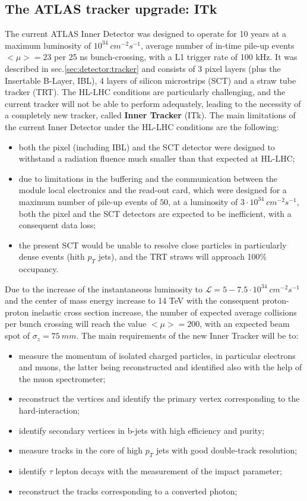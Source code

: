 \documentclass[a4paper,twoside,12pt]{article}
\begin{document}
\subsection{The ATLAS tracker upgrade: ITk}
The current ATLAS Inner Detector was designed to operate for 10 years at a maximum luminosity of $10^{34}\ cm^{-2} s^{-1}$, 
average number of in-time pile-up events $<\mu> = 23$ per 25 ns bunch-crossing, with a L1 trigger rate of 100 kHz\cite{loi}. It
was described in sec.\ref{sec:detector:tracker} and consists of 3 pixel layers (plus the Insertable B-Layer, IBL), 4 layers of silicon microstrips (SCT)
and a straw tube tracker (TRT). The HL-LHC conditions are particularly challenging, and the current tracker will not be able to perform adequately, leading to the necessity of a completely new tracker, called \textbf{Inner Tracker} (ITk). The main limitations of the current Inner Detector under the HL-LHC conditions are the following:

\begin{itemize}
\item both the pixel (including IBL) and the SCT detector were designed to withstand a radiation fluence much smaller
than that expected at HL-LHC;
\item due to limitations in the buffering and the communication between the module local electronics and the read-out card, which
were designed for a maximum number of pile-up events of $50$,
at a luminosity of $3 \cdot 10^{34}\ cm^{-2}s^{-1}$, both the pixel and the SCT detectors are expected to be inefficient, with
a consequent data loss;
\item the present SCT would be unable to resolve close particles in particularly dense events (hith $p_{T}$ jets), and the TRT straws
	will approach 100\% occupancy.
\end{itemize}

Due to the increase of the instantaneous luminosity to $\mathcal{L} = 5 - 7.5 \cdot 10^{34}\ cm^{-2}s^{-1}$ and the center of mass energy increase to 
14 TeV with the consequent proton-proton inelastic cross section increase, the number of expected average collisions per bunch crossing will 
reach the value $<\mu> = 200$, with an expected beam spot of $\sigma_{z} = 75\ mm$. The main requirements of the new Inner Tracker will be to:

\begin{itemize}
\item measure the momentum of isolated charged particles, in particular electrons and muons, the latter being reconstructed and identified also with
the help of the muon spectrometer;
\item reconstruct the vertices and identify the primary vertex corresponding to the hard-interaction;
\item identify secondary vertices in b-jets with high efficiency and purity;
\item measure tracks in the core of high $p_{T}$ jets with good double-track resolution;
\item identify $\tau$ lepton decays with the measurement of the impact parameter;
\item reconstruct the tracks corresponding to a converted photon;
\end{itemize}
\end{document}
